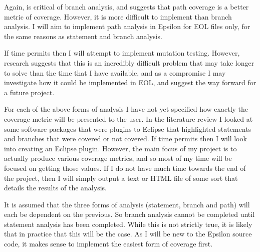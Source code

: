 Again, \citet{Myers:2004:AST:983238} is critical of branch analysis, and suggests that path coverage is a better metric of coverage. However, it is more difficult to implement than branch analysis. I will aim to implement path analysis in Epsilon for EOL files only, for the same reasons as statement and branch analysis.

If time permits then I will attempt to implement mutation testing. However, research suggests that this is an incredibly difficult problem that may take longer to solve than the time that I have available, and as a compromise I may investigate how it could be implemented in EOL, and suggest the way forward for a future project.

For each of the above forms of analysis I have not yet specified how exactly the coverage metric will be presented to the user. In the literature review I looked at some software packages that were plugins to Eclipse that highlighted statements and branches that were covered or not covered. If time permits then I will look into creating an Eclipse plugin. However, the main focus of my project is to actually produce various coverage metrics, and so most of my time will be focused on getting those values. If I do not have much time towards the end of the project, then I will simply output a text or HTML file of some sort that details the results of the analysis.

It is assumed that the three forms of analysis (statement, branch and path) will each be dependent on the previous. So branch analysis cannot be completed until statement analysis has been completed. While this is not strictly true, it is likely that in practice that this will be the case. As I will be new to the Epsilon source code, it makes sense to implement the easiest form of coverage first.